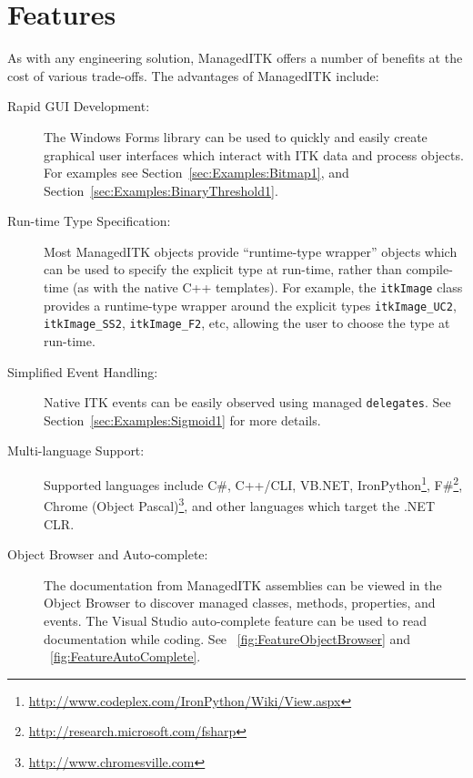 \documentclass{InsightArticle}
\def\code#1{\texttt{#1}}
\begin{document}
\section{Features}

As with any engineering solution,
ManagedITK offers a number of benefits at the cost of various trade-offs.
The advantages of ManagedITK include:
\begin{description}
	\item[Rapid GUI Development:] 
	The Windows Forms library can be used to quickly
	and easily create graphical user interfaces which interact with ITK data
	and process objects.
	For examples see 
	Section~\ref{sec:Examples:Bitmap1},
	and
	Section~\ref{sec:Examples:BinaryThreshold1}.
	
	\item[Run-time Type Specification:] 
	Most ManagedITK objects provide ``runtime-type wrapper'' objects which
	can be used to specify the explicit type at run-time,
	rather than compile-time (as with the native C++ templates).
	For example, the \code{itkImage} class provides a runtime-type
	wrapper around the explicit types \code{itkImage\_UC2}, \code{itkImage\_SS2},
	\code{itkImage\_F2}, etc, allowing the user to choose the type
	at run-time.	
	
	\item[Simplified Event Handling:] 
	Native ITK events can be easily observed using managed \code{delegates}.
	See Section~\ref{sec:Examples:Sigmoid1} for more details.
	
	\item[Multi-language Support:] Supported languages include 
	C\#, 
	C++/CLI, 
	VB.NET, 
	IronPython\footnote{\href{http://www.codeplex.com/IronPython/Wiki/View.aspx}
							 {http://www.codeplex.com/IronPython/Wiki/View.aspx}}, 
	F\#\footnote{\href{http://research.microsoft.com/fsharp}
					  {http://research.microsoft.com/fsharp}}, 
	Chrome (Object Pascal)\footnote{\href{http://www.chromesville.com}
										 {http://www.chromesville.com}},
	and other languages which target the .NET CLR.
	
	\item[Object Browser and Auto-complete:] 
	The documentation from ManagedITK assemblies can be viewed in the 
	Object Browser to discover managed classes, methods, properties, and events.
	The Visual Studio auto-complete feature can be used to read documentation
	while coding. See \figurename~\ref{fig:FeatureObjectBrowser} and
	\figurename~\ref{fig:FeatureAutoComplete}.
\end{description}
\end{document}

